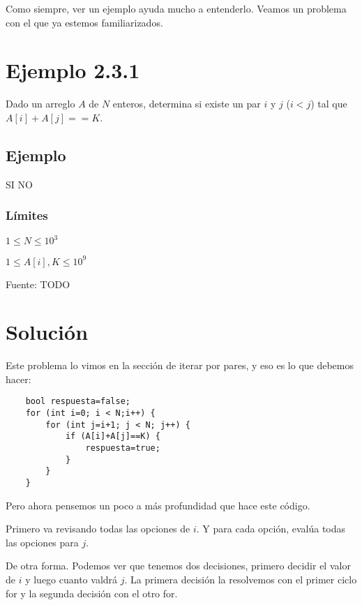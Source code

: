 Como siempre, ver un ejemplo ayuda mucho a entenderlo. Veamos un problema con el que ya estemos familiarizados.
\section*{Ejemplo 2.3.1}
Dado un arreglo \(A\) de \(N\) enteros, determina si existe un par \(i\) y \(j\) (\(i<j\)) tal que \(A[i]+A[j]==K\).

\subsection*{Ejemplo}
\begin{casebox2}
	{SI}
	 {
		NO
	}

\end{casebox2}
\subsubsection*{Límites}
\begin{plimits}
	\item \(1\leq N \leq 10^3\)
	\item \(1\leq A[i], K \leq 10^9\)
\end{plimits}

Fuente: TODO

\section*{Solución}
Este problema lo vimos en la sección de iterar por pares, y eso es lo que debemos hacer:

\begin{lstlisting}
	bool respuesta=false;
	for (int i=0; i < N;i++) {
		for (int j=i+1; j < N; j++) {
			if (A[i]+A[j]==K) {
				respuesta=true;
			}
		}
	}
\end{lstlisting}

Pero ahora pensemos un poco a más profundidad que hace este código.

Primero va revisando todas las opciones de \(i\). Y para cada opción, evalúa todas las opciones para \(j\).

De otra forma. Podemos ver que tenemos dos decisiones, primero decidir el valor de \(i\) y luego cuanto valdrá \(j\). La primera decisión la resolvemos con el primer ciclo for y la segunda decisión con el otro for.


